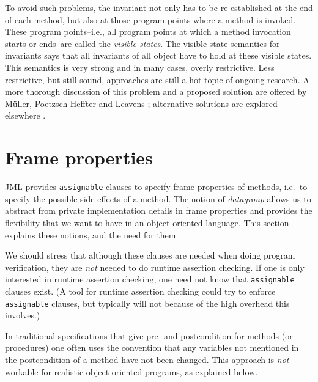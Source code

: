 \documentclass{llncs}
\begin{document}
To avoid such problems, the invariant not only has to be re-established at the
end of each method, but also at those program points where a method is invoked.
These program points--i.e., all program points
at which a method invocation starts or ends--are called the \emph{visible
states}. The visible state semantics for invariants says that all invariants
of all object have to hold at these visible states.
%
This semantics is very strong and in many cases,
overly restrictive.  Less restrictive, but still sound, approaches are still a
hot topic of ongoing research. A more thorough discussion of this problem
and a proposed solution are offered by M\"{u}ller, Poetzsch-Heffter and
Leavens \cite{Mueller-Poetzsch-Heffter-Leavens05}; alternative solutions are
explored elsewhere
\cite{Huizing-Kuiper00,JacobsLeinoPiessensSchulte05,Middelkoop05}.

\section{Frame properties}
\label{Sec:assignable}


JML provides \texttt{assignable} clauses to specify frame properties
of methods, i.e.\ to specify the possible side-effects of a method.
The notion of \emph{datagroup} allows us to abstract from private implementation 
details in frame properties and provides the flexibility that we want to have 
in an object-oriented language.
This section explains these notions, and the need for them.

We should stress that although these clauses are needed when doing
program verification, they are \emph{not} needed to do runtime assertion checking. 
If one is only interested in runtime assertion checking, one need not know 
that \texttt{assignable} clauses exist.
(A tool for runtime assertion checking could try to enforce \texttt{assignable} 
clauses, but typically will not because of the high overhead this involves.)

\smallskip

In traditional specifications that give pre- and postcondition for methods
(or procedures) one often uses the convention that any variables not mentioned 
in the postcondition of a method have not been changed.  This approach is 
\emph{not} workable for realistic object-oriented programs, as explained below.
\end{document}
